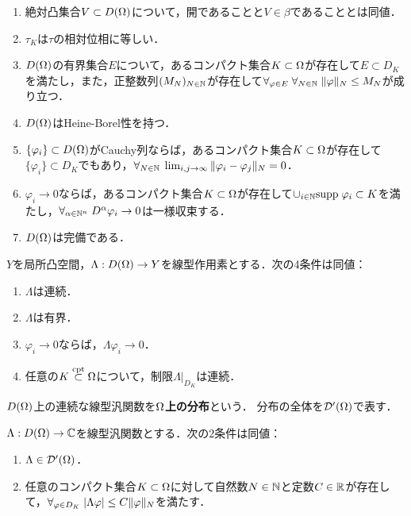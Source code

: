 \documentclass[uplatex,dvipdfmx]{jsreport}
\begin{document}
\begin{theorem}\mbox{}
    \begin{enumerate}
        \item 絶対凸集合$V\subset D(\Omega)$について，開であることと$V\in\beta$であることとは同値．
        \item $\tau_K$は$\tau$の相対位相に等しい．
        \item $D(\Omega)$の有界集合$E$について，あるコンパクト集合$K\subset\Omega$が存在して$E\subset D_K$を満たし，また，正整数列$(M_N)_{N\in\mathbb{N}}$が存在して$\forall_{\varphi\in E}\;\forall_{N\in\mathbb{N}}\;\|\varphi\|_N\le M_N$が成り立つ．
        \item $D(\Omega)$はHeine-Borel性を持つ．
        \item $\{\varphi_i\}\subset D(\Omega)$がCauchy列ならば，あるコンパクト集合$K\subset\Omega$が存在して$\{\varphi_i\}\subset D_K$でもあり，$\forall_{N\in\mathbb{N}}\;\lim_{i,j\to\infty}\|\varphi_i-\varphi_j\|_N=0$．
        \item $\varphi_i\to0$ならば，あるコンパクト集合$K\subset\Omega$が存在して$\cup_{i\in\mathbb{N}}\mathrm{supp}\;\varphi_i\subset K$を満たし，$\forall_{\alpha\in\mathbb{N}^n}\;D^\alpha\varphi_i\to0$は一様収束する．
        \item $D(\Omega)$は完備である．
    \end{enumerate}
\end{theorem}

\begin{theorem}
    $Y$を局所凸空間，$\Lambda:D(\Omega)\to Y$を線型作用素とする．次の4条件は同値：
    \begin{enumerate}
        \item $\Lambda$は連続．
        \item $\Lambda$は有界．
        \item $\varphi_i\to0$ならば，$\Lambda\varphi_i\to0$．
        \item 任意の$K\overset{\textrm{cpt}}{\subset}\Omega$について，制限$\Lambda|_{D_K}$は連続．
    \end{enumerate}
\end{theorem}

\begin{definition}[distribution]
    $D(\Omega)$上の連続な線型汎関数を\textbf{$\Omega$上の分布}という．
    分布の全体を$\mathcal{D}'(\Omega)$で表す．
\end{definition}

\begin{theorem}
    $\Lambda:D(\Omega)\to\mathbb{C}$を線型汎関数とする．次の2条件は同値：
    \begin{enumerate}
        \item $\Lambda\in\mathcal{D}'(\Omega)$．
        \item 任意のコンパクト集合$K\subset\Omega$に対して自然数$N\in\mathbb{N}$と定数$C\in\mathbb{R}$が存在して，$\forall_{\varphi\in D_K}\;\lvert\Lambda\varphi\rvert\le C\|\varphi\|_N$を満たす．
    \end{enumerate}
\end{theorem}
\end{document}
